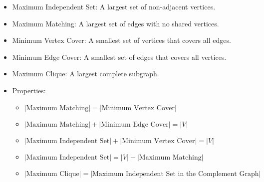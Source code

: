 \begin{itemize}
\item Maximum Independent Set: A largest set of non-adjacent vertices.
\item Maximum Matching: A largest set of edges with no shared vertices.
\item Minimum Vertex Cover: A smallest set of vertices that covers all edges.
\item Minimum Edge Cover: A smallest set of edges that covers all vertices.
\item Maximum Clique: A largest complete subgraph.
\item Properties:
    \begin{itemize}
        \item \(|\text{Maximum Matching}| = |\text{Minimum Vertex Cover}|\)
        \item \(|\text{Maximum Matching}| + |\text{Minimum Edge Cover}| = |V|\)
        \item \(|\text{Maximum Independent Set}| + |\text{Minimum Vertex Cover}| = |V|\)
        \item \(|\text{Maximum Independent Set}| = |V| - |\text{Maximum Matching}|\)
        \item \(|\text{Maximum Clique}| = |\text{Maximum Independent Set in the Complement Graph}|\)
    \end{itemize}
\end{itemize}
